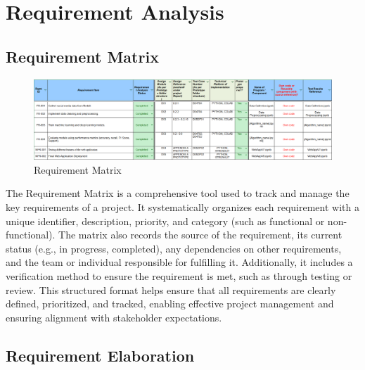 \pagebreak

\section{Requirement Analysis}

\subsection{Requirement Matrix}
\begin{figure}[h!]  
    \centering
    \includegraphics[width=1.0\textwidth]{Images/Requirement Matrix.png}  
    \caption{Requirement Matrix}
    \label{Requirement Matrix}  %
\end{figure}

\noindent
The Requirement Matrix is a comprehensive tool used to track and manage the key requirements of a project. It systematically organizes each requirement with a unique identifier, description, priority, and category (such as functional or non-functional). The matrix also records the source of the requirement, its current status (e.g., in progress, completed), any dependencies on other requirements, and the team or individual responsible for fulfilling it. Additionally, it includes a verification method to ensure the requirement is met, such as through testing or review. This structured format helps ensure that all requirements are clearly defined, prioritized, and tracked, enabling effective project management and ensuring alignment with stakeholder expectations.

\subsection{Requirement Elaboration}



